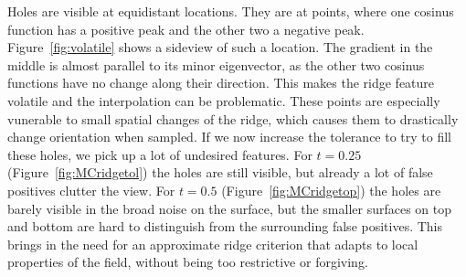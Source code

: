 Holes are visible at equidistant locations. They are at points, where
one cosinus function has a positive peak and the other two a negative
peak. Figure~\ref{fig:volatile} shows a sideview of such a location. The
gradient in the middle is almost parallel to its minor eigenvector, as
the other two cosinus functions have no change along their direction.
This makes the ridge feature volatile and the interpolation can be
problematic. These points are especially vunerable to small spatial
changes of the ridge, which causes them to drastically change
orientation when sampled. If we now increase the tolerance to try to
fill these holes, we pick up a lot of undesired features. For $t=0.25$
(Figure~\ref{fig:MCridgetol}) the holes are still visible, but already a
lot of false positives clutter the view. For $t=0.5$
(Figure~\ref{fig:MCridgetop}) the holes are barely visible in the broad
noise on the surface, but the smaller surfaces on top and bottom are
hard to distinguish from the surrounding false positives. This brings in
the need for an approximate ridge criterion that adapts to local
properties of the field, without being too restrictive or forgiving.

